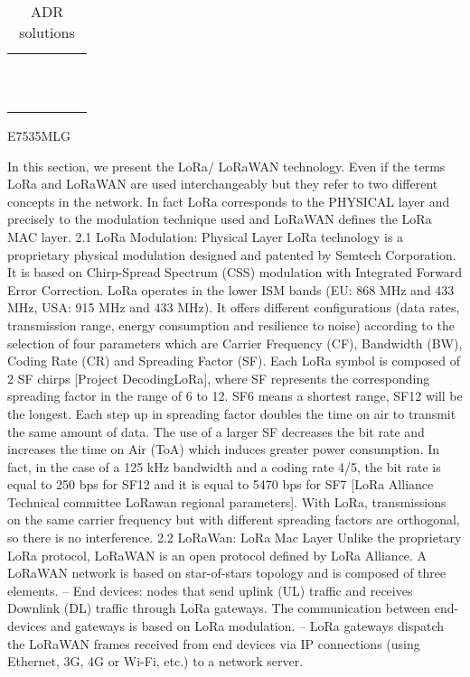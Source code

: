 \begin{longtable}{lllll}
	\     &                                                &                               &                                        &                                                               \\
	\     &                                                &                               &                                        &                                                               \\
\caption{ADR solutions}
\end{longtable}

\clearpage
\newpage
\setlength{\hoffset}{-0in}
\twocolumn


\cite{montavont_enhanced_2018}E7535MLG

In this section,
	we present the LoRa/ LoRaWAN technology.
Even if the terms LoRa and LoRaWAN are used interchangeably but they refer to two different concepts in the network.
In fact LoRa corresponds to the PHYSICAL layer and precisely to the modulation technique used and LoRaWAN defines the LoRa MAC layer.
2.1 LoRa Modulation:
	Physical Layer LoRa technology is a proprietary physical modulation designed and patented by Semtech Corporation.
It is based on Chirp-Spread Spectrum (CSS) modulation \cite{springer_spread_2000} with Integrated Forward Error Correction.
LoRa operates in the lower ISM bands (EU: 868 MHz and 433 MHz,
	USA: 915 MHz and 433 MHz).
It offers different configurations (data rates,
	transmission range,
	energy consumption and resilience to noise) according to the selection of four parameters which are Carrier Frequency (CF),
	Bandwidth (BW),
	Coding Rate (CR) and Spreading Factor (SF).
Each LoRa symbol is composed of 2 SF chirps [Project DecodingLoRa],
	where SF represents the corresponding spreading factor in the range of 6 to 12.
SF6 means a shortest range,
	SF12 will be the longest.
Each step up in spreading factor doubles the time on air to transmit the same amount of data.
The use of a larger SF decreases the bit rate and increases the time on Air (ToA) which induces greater power consumption.
In fact,
	in the case of a 125 kHz bandwidth and a coding rate 4/5,
	the bit rate is equal to 250 bps for SF12 and it is equal to 5470 bps for SF7 [LoRa Alliance Technical committee LoRawan regional parameters].
With LoRa,
	transmissions on the same carrier frequency but with different spreading factors are orthogonal,
	so there is no interference.
2.2 LoRaWan:
	LoRa Mac Layer Unlike the proprietary LoRa protocol,
	LoRaWAN is an open protocol defined by LoRa Alliance.
A LoRaWAN network is based on star-of-stars topology and is composed of three elements.
– End devices:
	nodes that send uplink (UL) traffic and receives Downlink (DL) traffic through LoRa gateways.
The communication between end-devices and gateways is based on LoRa modulation.
– LoRa gateways dispatch the LoRaWAN frames received from end devices via IP connections (using Ethernet, 3G, 4G or Wi-Fi,
	etc.) to a network server.

